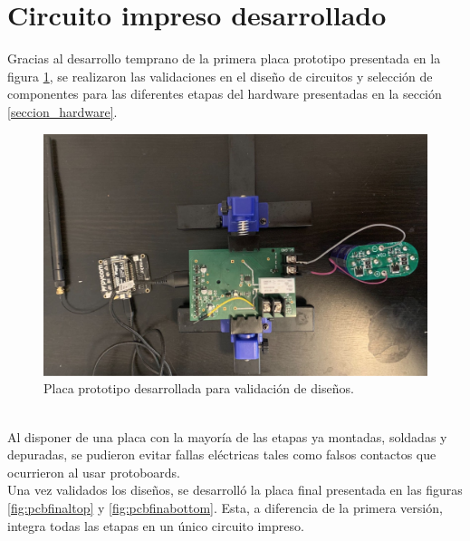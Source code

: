 \section{Circuito impreso desarrollado}
\label{sec:pruebasHW}
Gracias al desarrollo temprano de la primera placa prototipo presentada en la figura \ref{fig:placaprototipo}, se realizaron las validaciones en el diseño de circuitos y selección de componentes para las diferentes etapas del hardware presentadas en la sección \ref{seccion_hardware}.\\
\begin{figure}[h]
	\centering
	\includegraphics[width=1.0\linewidth]{Figures/placa_prototipo}
	\caption{Placa prototipo desarrollada para validación de diseños.}
	\label{fig:placaprototipo}
\end{figure}\\
Al disponer de una placa con la mayoría de las etapas ya montadas, soldadas y depuradas, se pudieron evitar fallas eléctricas tales como falsos contactos que ocurrieron al usar protoboards.\\
Una vez validados los diseños, se desarrolló la placa final presentada en las figuras \ref{fig:pcbfinaltop} y \ref{fig:pcbfinabottom}. Esta, a diferencia de la primera versi\'{o}n, integra todas las etapas en un único circuito impreso.\\
